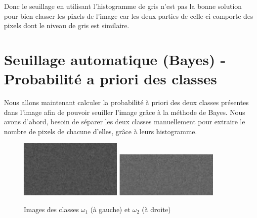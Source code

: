 \documentclass[a4paper,11pt]{article}
\begin{document}
  
  Donc le seuillage en utilisant l'histogramme de gris n'est pas la bonne solution pour 
  bien classer les pixels de l'image car les deux parties de celle-ci comporte des pixels
  dont le niveau de gris est similaire.
  
  \section{Seuillage automatique (Bayes) - Probabilité a priori des classes}
  Nous allons maintenant calculer la probabilité à priori des deux classes présentes dans l'image
  afin de pouvoir seuiller l'image grâce à la méthode de Bayes. Nous avons d'abord, besoin de séparer
  les deux classes manuellement pour extraire le nombre de pixels de chacune d'elles, grâce à leurs 
  histogramme.\\
  
  \begin{figure}[H]
    \center
    \includegraphics[width=5cm]{3classes_100_156_8bits_omega1.png}
    \includegraphics[width=5cm]{3classes_100_156_8bits_omega2.png}
    \caption{Images des classes $\omega_{1}$ (à gauche) et $\omega_{2}$ (à droite)}
  \end{figure}
  
\end{document}
